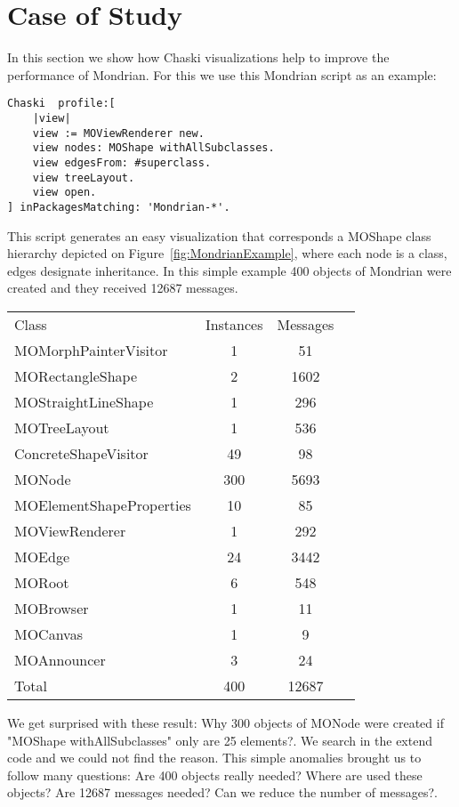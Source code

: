\documentclass{sig-alternate}
\newcommand{\seclabel}[1]{\label{sec:#1}}
\newcommand{\figref}[1]{Figure~\ref{fig:#1}}
\begin{document}
\section{Case of Study}\seclabel{case study}

In this section we show how Chaski visualizations help to improve the performance of Mondrian.
For this we use this Mondrian script as an example:
\begin{lstlisting}[language=Smalltalk]
Chaski  profile:[
	|view|
	view := MOViewRenderer new.
	view nodes: MOShape withAllSubclasses.
	view edgesFrom: #superclass.
	view treeLayout.
	view open.
] inPackagesMatching: 'Mondrian-*'.
\end{lstlisting}

This script generates an easy visualization that corresponds a MOShape class hierarchy depicted on \figref{MondrianExample}, where each node is a class, edges designate inheritance. In this simple example 400 objects of Mondrian were created and they received 12687 messages.

\begin{center}
   \begin{tabular}{|l||ccr|} \hline
	Class & Instances & Messages \\
	MOMorphPainterVisitor & 1 & 51	\\
	MORectangleShape & 2 & 1602	\\
	MOStraightLineShape & 1 & 296	\\
	MOTreeLayout & 1 & 536	\\
	ConcreteShapeVisitor & 49 & 98 \\
	MONode & 300 & 5693\\
	MOElementShapeProperties & 10 & 85\\
	MOViewRenderer & 1 & 292\\
	MOEdge & 24 & 3442\\
	MORoot & 6 & 548\\
	MOBrowser & 1 & 11\\
	MOCanvas & 1 & 9\\
	MOAnnouncer & 3 & 24\\
	Total & 400 & 12687 \\
   \end{tabular}
\end{center}

We get surprised with these result: Why 300 objects of MONode were created if "MOShape withAllSubclasses" only are 25 elements?. We search in the extend code and we could not find the reason. This simple anomalies brought us to follow many questions: Are 400 objects really needed? Where are used these objects? Are 12687 messages needed? Can we reduce the number of messages?.
\end{document}
